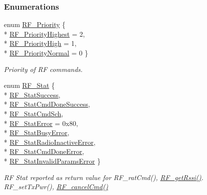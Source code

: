 \subsubsection*{Enumerations}
\begin{DoxyCompactItemize}
\item 
enum \hyperlink{_r_f_8h_ae5f9a893d178e64e6d0a7a783ea06e32}{R\+F\+\_\+\+Priority} \{ \\*
\hyperlink{_r_f_8h_ae5f9a893d178e64e6d0a7a783ea06e32a5d716915abbe5a6fad3469c339f4db15}{R\+F\+\_\+\+Priority\+Highest} = 2, 
\\*
\hyperlink{_r_f_8h_ae5f9a893d178e64e6d0a7a783ea06e32a8d14673dbb643f2e9571fb5e34aad23d}{R\+F\+\_\+\+Priority\+High} = 1, 
\\*
\hyperlink{_r_f_8h_ae5f9a893d178e64e6d0a7a783ea06e32a301d2e5af295d52039b52709952a1c47}{R\+F\+\_\+\+Priority\+Normal} = 0
 \}
\begin{DoxyCompactList}\small\item\em Priority of R\+F commands. \end{DoxyCompactList}\item 
enum \hyperlink{_r_f_8h_afdc219ddabc8427ecd552a6c78d9988f}{R\+F\+\_\+\+Stat} \{ \\*
\hyperlink{_r_f_8h_afdc219ddabc8427ecd552a6c78d9988faa98bd78e437864464cdb2aca1d3e024d}{R\+F\+\_\+\+Stat\+Success}, 
\\*
\hyperlink{_r_f_8h_afdc219ddabc8427ecd552a6c78d9988faa110d04edae5a85a12906d729f97de87}{R\+F\+\_\+\+Stat\+Cmd\+Done\+Success}, 
\\*
\hyperlink{_r_f_8h_afdc219ddabc8427ecd552a6c78d9988fabf33d4930fd89cd5ca80220da258d31c}{R\+F\+\_\+\+Stat\+Cmd\+Sch}, 
\\*
\hyperlink{_r_f_8h_afdc219ddabc8427ecd552a6c78d9988fac071b8de44aabb8e2354432ce1146b86}{R\+F\+\_\+\+Stat\+Error} = 0x80, 
\\*
\hyperlink{_r_f_8h_afdc219ddabc8427ecd552a6c78d9988faa79a13241903199d3bc25c8f06407de9}{R\+F\+\_\+\+Stat\+Busy\+Error}, 
\\*
\hyperlink{_r_f_8h_afdc219ddabc8427ecd552a6c78d9988fa80848b887667038bbfa4a2d14e83b193}{R\+F\+\_\+\+Stat\+Radio\+Inactive\+Error}, 
\\*
\hyperlink{_r_f_8h_afdc219ddabc8427ecd552a6c78d9988fa612e247f325ff085321b8e243f6b1d3d}{R\+F\+\_\+\+Stat\+Cmd\+Done\+Error}, 
\\*
\hyperlink{_r_f_8h_afdc219ddabc8427ecd552a6c78d9988face124dc75bad005452467d6f29351301}{R\+F\+\_\+\+Stat\+Invalid\+Params\+Error}
 \}
\begin{DoxyCompactList}\small\item\em R\+F Stat reported as return value for R\+F\+\_\+rat\+Cmd(), \hyperlink{_r_f_8h_ac3fe0d39243fb6bbefe0216d958a6779}{R\+F\+\_\+get\+Rssi()}. R\+F\+\_\+set\+Tx\+Pwr(), \hyperlink{_r_f_8h_aabe22ceae13a372be4ba135318aa849a}{R\+F\+\_\+cancel\+Cmd()} \end{DoxyCompactList}\item 

\end{DoxyCompactItemize}

